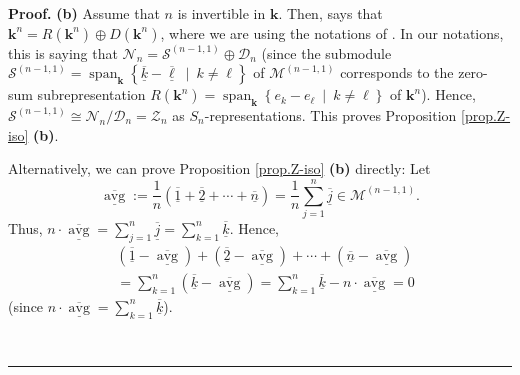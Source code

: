 \documentclass[numbers=enddot,12pt,final,onecolumn,notitlepage]{scrartcl}%
\theoremstyle{definition}
\newenvironment{proof}[1][Proof]{\noindent\textbf{#1.} }{\ \rule{0.5em}{0.5em}}
\let\sumnonlimits\sum
\renewcommand{\sum}{\sumnonlimits\limits}
\begin{document}
\begin{proof}
\textbf{(b)} Assume that $n$ is invertible in $\mathbf{k}$. Then,
\cite[Proposition 4.2.28 \textbf{(a)}]{sga} says that $\mathbf{k}^{n}=R\left(
\mathbf{k}^{n}\right)  \oplus D\left(  \mathbf{k}^{n}\right)  $, where we are
using the notations of \cite{sga}. In our notations, this is saying that
$\mathcal{N}_{n}=\mathcal{S}^{\left(  n-1,1\right)  }\oplus\mathcal{D}_{n}$
(since the submodule $\mathcal{S}^{\left(  n-1,1\right)  }%
=\operatorname*{span}\nolimits_{\mathbf{k}}\left\{  \underline{\overline{k}%
}-\underline{\overline{\ell}}\ \mid\ k\neq\ell\right\}  $ of $\mathcal{M}%
^{\left(  n-1,1\right)  }$ corresponds to the zero-sum subrepresentation
$R\left(  \mathbf{k}^{n}\right)  =\operatorname*{span}\nolimits_{\mathbf{k}%
}\left\{  e_{k}-e_{\ell}\ \mid\ k\neq\ell\right\}  $ of $\mathbf{k}^{n}$).
Hence, $\mathcal{S}^{\left(  n-1,1\right)  }\cong\mathcal{N}_{n}%
/\mathcal{D}_{n}=\mathcal{Z}_{n}$ as $S_{n}$-representations. This proves
Proposition \ref{prop.Z-iso} \textbf{(b)}.

Alternatively, we can prove Proposition \ref{prop.Z-iso} \textbf{(b)}
directly: Let
\[
\underline{\overline{\operatorname*{avg}}}:=\dfrac{1}{n}\left(
\underline{\overline{1}}+\underline{\overline{2}}+\cdots+\underline{\overline
{n}}\right)  =\dfrac{1}{n}\sum_{j=1}^{n}\underline{\overline{j}}\in
\mathcal{M}^{\left(  n-1,1\right)  }.
\]
Thus, $n\cdot\underline{\overline{\operatorname*{avg}}}=\sum_{j=1}%
^{n}\underline{\overline{j}}=\sum_{k=1}^{n}\underline{\overline{k}}$. Hence,%
\begin{align}
&  \left(  \underline{\overline{1}}-\underline{\overline{\operatorname*{avg}}%
}\right)  +\left(  \underline{\overline{2}}-\underline{\overline
{\operatorname*{avg}}}\right)  +\cdots+\left(  \underline{\overline{n}%
}-\underline{\overline{\operatorname*{avg}}}\right) \nonumber\\
&  =\sum_{k=1}^{n}\left(  \underline{\overline{k}}-\underline{\overline
{\operatorname*{avg}}}\right)  =\sum_{k=1}^{n}\underline{\overline{k}}%
-n\cdot\underline{\overline{\operatorname*{avg}}}=0 \label{pf.prop.Z-iso.b.2}%
\end{align}
(since $n\cdot\underline{\overline{\operatorname*{avg}}}=\sum_{k=1}%
^{n}\underline{\overline{k}}$).


\end{proof}
\end{document}
